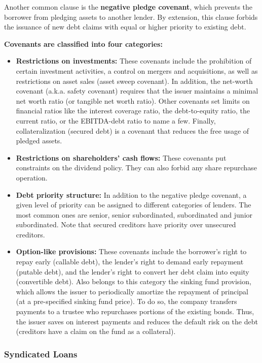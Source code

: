 \documentclass[12pt,a4paper]{article}
\begin{document}
Another common clause is the \textbf{negative pledge covenant}, which prevents the borrower from pledging assets to another lender. By extension, this clause forbids the issuance of new debt claims with equal or higher priority to existing debt.


\textbf{Covenants are classified into four categories:}
\begin{itemize}
    \item \textbf{Restrictions on investments:} These covenants include the prohibition of certain investment activities, a control on mergers and acquisitions, as well as restrictions on asset sales (asset sweep covenant). In addition, the net-worth covenant (a.k.a. safety covenant) requires that the issuer maintains a minimal net worth ratio (or tangible net worth ratio). Other covenants set limits on financial ratios like the interest coverage ratio, the debt-to-equity ratio, the current ratio, or the EBITDA-debt ratio to name a few. Finally, collateralization (secured debt) is a covenant that reduces the free usage of pledged assets.
    \item \textbf{Restrictions on shareholders' cash flows:} These covenants put constraints on the dividend policy. They can also forbid any share repurchase operation.
    \item \textbf {Debt priority structure:} In addition to the negative pledge covenant, a given level of priority can be assigned to different categories of lenders. The most common ones are senior, senior subordinated, subordinated and junior subordinated. Note that secured creditors have priority over unsecured creditors.
    \item \textbf{Option-like provisions:} These covenants include the borrower's right to repay early (callable debt), the lender's right to demand early repayment (putable debt), and the lender's right to convert her debt claim into equity (convertible debt). Also belongs to this category the sinking fund provision, which allows the issuer to periodically amortize the repayment of principal (at a pre-specified sinking fund price). To do so, the company transfers payments to a trustee who repurchases portions of the existing bonds. Thus, the issuer saves on interest payments and reduces the default risk on the debt (creditors have a claim on the fund as a collateral).
\end{itemize}

\subsubsection{Syndicated Loans}
\end{document}
